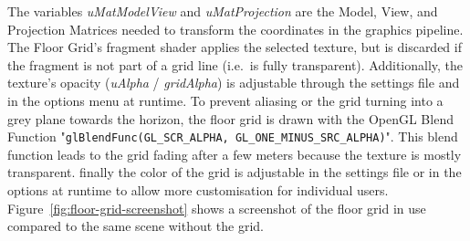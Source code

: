 The variables \textit{uMatModelView} and \textit{uMatProjection} are the Model, View, and Projection Matrices needed
to transform the coordinates in the graphics pipeline.
The Floor Grid's fragment shader applies the selected texture, but is discarded if the fragment is not part of a grid
line (i.e.\ is fully transparent).
Additionally, the texture's opacity (\textit{uAlpha} / \textit{gridAlpha}) is adjustable through the settings file and
in the options menu at runtime.
To prevent aliasing or the grid turning into a grey plane towards the horizon, the floor grid is drawn with the
OpenGL Blend Function "\texttt{glBlendFunc(GL_SCR_ALPHA, GL_ONE_MINUS_SRC_ALPHA)}".
This blend function leads to the grid fading after a few meters because the texture is mostly transparent.
finally the color of the grid is adjustable in the settings file or in the options at runtime to allow more
customisation for individual users.
Figure~\ref{fig:floor-grid-screenshot} shows a screenshot of the floor grid in use compared to the same scene without
the grid.
